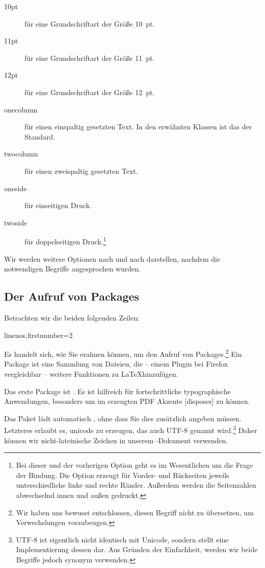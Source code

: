 \begin{description}
\item[10pt] für eine Grundschriftart der Größe 10~pt.
\item[11pt] für eine Grundschriftart der Größe 11~pt.
\item[12pt] für eine Grundschriftart der Größe 12~pt.
\item[onecolumn] für einen einspaltig gesetzten Text. In den erwähnten Klassen ist das der Standard.
\item[twocolumn] für einen zweispaltig gesetzten Text.
\item[oneside] für einseitigen Druck. \label{nbsides}
\item[twoside] für doppelseitigen Druck.\footnote{Bei dieser und der vorherigen Option geht es im Wesentlichen um die Frage der Bindung. Die Option  erzeugt für Vorder- und Rückseiten jeweils unterschiedliche linke und rechte Ränder. Außerdem werden die Seitenzahlen abwechselnd innen und außen gedruckt.}\label{rectoverso}
\end{description}

Wir werden weitere Optionen nach und nach darstellen, nachdem die notwendigen Begriffe angesprochen wurden.

\subsection{Der Aufruf von Packages}

Betrachten wir die beiden folgenden Zeilen: 

\begin{latexcode*}{linenos,firstnumber=2}
\usepackage{fontspec}
\usepackage{polyglossia}
\end{latexcode*}

Es handelt sich, wie Sie erahnen können, um den Aufruf von Packages.\footnote{Wir haben uns bewusst entschlossen, diesen Begriff nicht zu übersetzen, um Verwechslungen vorzubeugen.} Ein Package ist eine Sammlung von Dateien, die -- einem Plugin bei Firefox vergleichbar -- weitere Funktionen zu \LaTeX hinzufügen. 

Das erste Package ist . Es ist hilfreich für fortschrittliche typographische Anwendungen, besonders um im erzeugten PDF Akzente [disposer] zu können.

Das Paket  lädt automatisch , ohne dass Sie dies zusätzlich angeben müssen. Letzteres erlaubt es, unicode zu erzeugen, das auch UTF-8 genannt wird.\footnote{UTF-8 ist eigentlich nicht identisch mit Unicode, sondern stellt eine Implementierung dessen dar. Aus Gründen der Einfachheit, werden wir beide Begriffe jedoch synonym verwenden.} Daher können wir nicht-lateinische Zeichen in unserem -Dokument verwenden.

